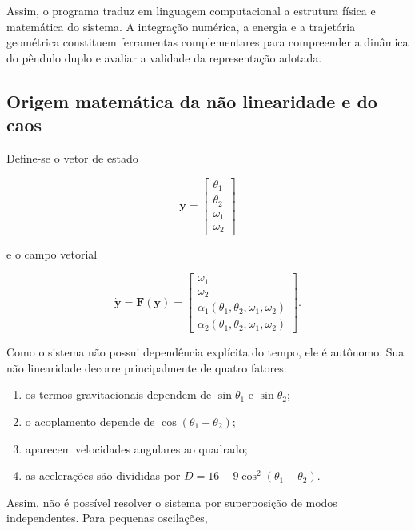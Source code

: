 \documentclass[12pt,a4paper]{article}
\begin{document}
Assim, o programa traduz em linguagem computacional a estrutura física e matemática do sistema. A integração numérica, a energia e a trajetória geométrica constituem ferramentas complementares para compreender a dinâmica do pêndulo duplo e avaliar a validade da representação adotada.

\subsection{Origem matemática da não linearidade e do caos}

Define-se o vetor de estado

\begin{equation}
\mathbf{y}=\begin{bmatrix}
\theta_1\\
\theta_2\\
\omega_1\\
\omega_2
\end{bmatrix}
\end{equation}

e o campo vetorial

\begin{equation}
\dot{\mathbf{y}}=\mathbf{F}(\mathbf{y})=
\begin{bmatrix}
\omega_1\\
\omega_2\\
\alpha_1(\theta_1,\theta_2,\omega_1,\omega_2)\\
\alpha_2(\theta_1,\theta_2,\omega_1,\omega_2)
\end{bmatrix}.
\end{equation}

Como o sistema não possui dependência explícita do tempo, ele é autônomo. Sua não linearidade decorre principalmente de quatro fatores:

\begin{enumerate}
    \item os termos gravitacionais dependem de $\sin\theta_1$ e $\sin\theta_2$;
    \item o acoplamento depende de $\cos(\theta_1-\theta_2)$;
    \item aparecem velocidades angulares ao quadrado;
    \item as acelerações são divididas por
    $D=16-9\cos^2(\theta_1-\theta_2)$.
\end{enumerate}

Assim, não é possível resolver o sistema por superposição de modos independentes. Para pequenas oscilações,
\end{document}
